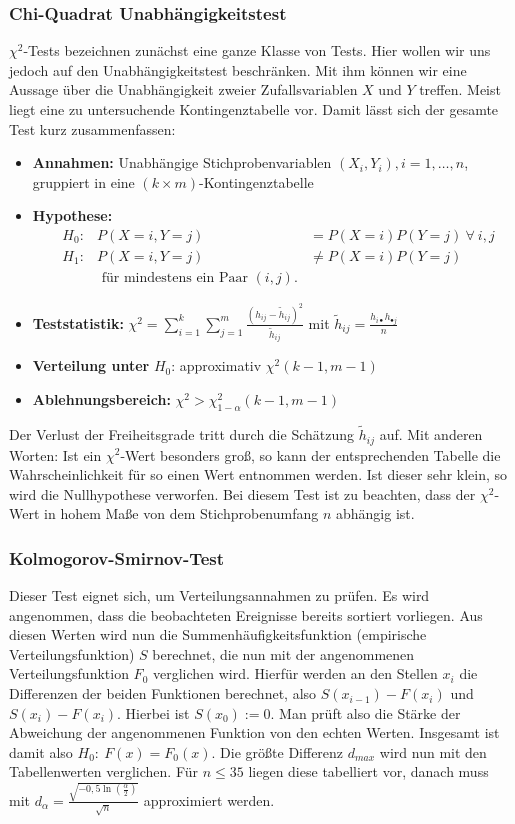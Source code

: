 \subsubsection{Chi-Quadrat Unabhängigkeitstest}
\(\chi^{2}\)-Tests bezeichnen zunächst eine ganze Klasse von Tests. Hier wollen wir uns jedoch auf den Unabhängigkeitstest beschränken.
Mit ihm können wir eine Aussage über die Unabhängigkeit zweier Zufallsvariablen
 \(X\) und \(Y\) treffen. Meist liegt eine zu untersuchende Kontingenztabelle
vor. Damit lässt sich der gesamte Test kurz zusammenfassen:
\begin{itemize}
	\item \textbf{Annahmen:} Unabhängige  Stichprobenvariablen \((X_i,Y_i), i = 1,\dots , n\), gruppiert in eine \((k\times m)\)-Kontingenztabelle
	\item \textbf{Hypothese:} \begin{align*}
					&H_0: &P(X=i,Y=j) &= P(X=i) P(Y=j)\ \forall\ i,j\\
					&H_1: &P(X=i,Y=j) &\neq P(X=i) P(Y=j)\\
					& &\text{ für mindestens ein Paar } (i,j).&
				\end{align*}
	\item \textbf{Teststatistik:} \(\chi^2 =\sum\limits_{i=1}^{k}\sum\limits_{j=1}^{m}
					\frac{(h_{ij}-\tilde{h}_{ij})^2}{\tilde{h}_{ij}}\) mit \(\tilde{h}_{ij} = \frac{ h_{i\bullet} h_{\bullet j}}{ n } \)
	\item \textbf{Verteilung unter } \(H_0\): approximativ \(\chi^2(k-1,m-1)\)
	\item \textbf{Ablehnungsbereich:} \(\chi^2 > \chi_{1-\alpha}^2(k-1,m-1)\)
\end{itemize}
Der Verlust der Freiheitsgrade tritt durch die Schätzung \(\tilde{h}_{ij}\) auf.
Mit anderen Worten: Ist ein \(\chi^2\)-Wert besonders groß, so kann der
entsprechenden Tabelle die Wahrscheinlichkeit für so einen Wert entnommen werden. Ist dieser sehr
klein, so wird die Nullhypothese verworfen. Bei diesem Test ist zu beachten,
dass der \(\chi^2\)-Wert in hohem Maße von dem Stichprobenumfang \(n\) abhängig ist.

\subsubsection{Kolmogorov-Smirnov-Test}
Dieser Test eignet sich, um Verteilungsannahmen zu prüfen. Es wird angenommen, 
dass die beobachteten Ereignisse bereits sortiert vorliegen. Aus diesen Werten
wird nun die Summenhäufigkeitsfunktion (empirische Verteilungsfunktion) \(S\) berechnet,
die nun mit der angenommenen Verteilungsfunktion \(F_0\) verglichen wird. Hierfür werden
an den Stellen \(x_i\) die Differenzen der beiden Funktionen berechnet, also
\(S(x_{i-1})-F(x_i)\) und \(S(x_i)-F(x_i)\). Hierbei ist \(S(x_0):=0\). Man prüft also
die Stärke der Abweichung der angenommenen Funktion von den echten Werten.
Insgesamt ist damit also \(H_0:\ F(x)=F_0(x).\)
Die größte Differenz \(d_{max}\) wird nun mit den Tabellenwerten verglichen. 
Für \(n \leq 35\) liegen diese tabelliert vor, danach muss mit 
\(d_\alpha =\frac{\sqrt{-0,5\ln(\frac{\alpha}{2})}}{\sqrt{n}}\) approximiert werden.

